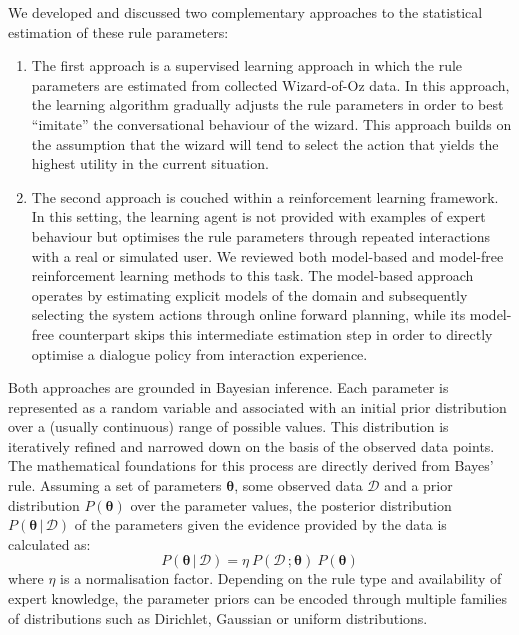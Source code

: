 We developed and discussed two complementary approaches to the statistical estimation of these rule parameters:
\begin{enumerate}
\item The first approach is a supervised learning approach in which the rule parameters are estimated from collected Wizard-of-Oz data.  In this approach, the learning algorithm gradually adjusts the rule parameters in order to best ``imitate'' the conversational behaviour of the wizard. This approach builds on the assumption that the wizard will tend to select the action that yields the highest utility in the current situation. 
\item The second approach is couched within a reinforcement learning framework.  In this setting, the learning agent is not provided with examples of expert behaviour but optimises the rule parameters through repeated interactions with a real or simulated user. We reviewed both model-based and model-free reinforcement learning methods to this task.  The model-based approach operates by estimating explicit models of the domain and subsequently selecting the system actions through online forward planning, while its model-free counterpart skips this intermediate estimation step in order to directly optimise a dialogue policy from interaction experience. 
\end{enumerate}

Both approaches are grounded in Bayesian inference.  Each parameter is represented as a random variable and associated with an initial prior distribution over a (usually continuous) range of possible values. This distribution is iteratively refined and narrowed down on the basis of the observed data points. The mathematical foundations for this process are directly derived from Bayes' rule. Assuming a set of parameters $\boldsymbol\theta$, some observed data $\mathcal{D}$ and a prior distribution $P(\boldsymbol\theta)$ over the parameter values, the posterior distribution $P(\boldsymbol\theta \, | \, \mathcal{D})$ of the parameters given the evidence provided by the data is calculated as:
\begin{equation}
P(\boldsymbol\theta \, | \, \mathcal{D}) = \eta \ P(\mathcal{D} \,; \boldsymbol\theta) \ P(\boldsymbol\theta)
\end{equation}
where $\eta$ is a normalisation factor. Depending on the rule type and availability of expert knowledge, the parameter priors can be encoded through multiple families of distributions such as Dirichlet, Gaussian or uniform distributions. 

